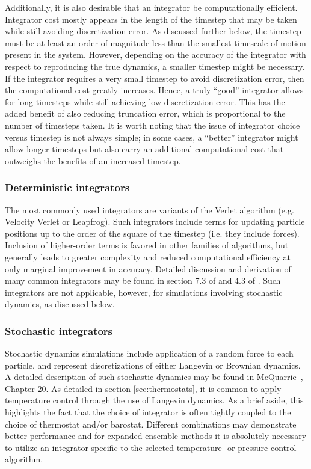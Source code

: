 \documentclass[9pt,bestpractices]{livecoms}
\begin{document}
Additionally, it is also desirable that an integrator be computationally efficient.
Integrator cost mostly appears in the length of the timestep that may be taken while still avoiding discretization error. 
As discussed further below, the timestep must be at least an order of magnitude less than the smallest timescale of motion present in the system.
However, depending on the accuracy of the integrator with respect to reproducing the true dynamics, a smaller timestep might be necessary.
If the integrator requires a very small timestep to avoid discretization error, then the computational cost greatly increases.
Hence, a truly ``good'' integrator allows for long timesteps while still achieving low discretization error.
This has the added benefit of also reducing truncation error, which is proportional to the number of timesteps taken.
It is worth noting that the issue of integrator choice versus timestep is not always simple; in some cases, a ``better'' integrator might allow longer timesteps but also carry an additional computational cost that outweighs the benefits of an increased timestep.

\subsubsection{Deterministic integrators}

The most commonly used integrators are variants of the Verlet algorithm (e.g. Velocity Verlet or Leapfrog).
Such integrators include terms for updating particle positions up to the order of the square of the timestep (i.e. they include forces).
Inclusion of higher-order terms is favored in other families of algorithms, but generally leads to greater complexity and reduced computational efficiency at only marginal improvement in accuracy.
Detailed discussion and derivation of many common integrators may be found in section 7.3 of \citet{LeachBook} and 4.3 of \citet{Frenkel:2001:}.
Such integrators are not applicable, however, for simulations involving stochastic dynamics, as discussed below.

\subsubsection{Stochastic integrators}

Stochastic dynamics simulations include application of a random force to each particle, and represent discretizations of either Langevin or Brownian dynamics.
A detailed description of such stochastic dynamics may be found in McQuarrie~\cite{McQuarrieStatMechBook}, Chapter 20.
As detailed in section \ref{sec:thermostats}, it is common to apply temperature control through the use of Langevin dynamics.
As a brief aside, this highlights the fact that the choice of integrator is often tightly coupled to the choice of thermostat and/or barostat.
Different combinations may demonstrate better performance and for expanded ensemble methods it is absolutely necessary to utilize an integrator specific to the selected temperature- or pressure-control algorithm.
\end{document}
